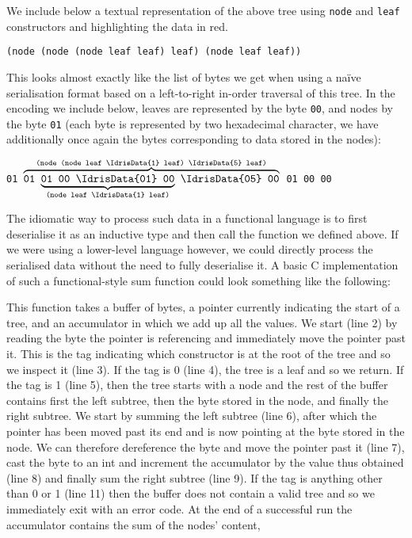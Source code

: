 We include below a textual representation of the above tree using
\texttt{node} and \texttt{leaf} constructors and highlighting the
data in red.

\medskip
  \texttt{(node (node (node leaf  leaf)  leaf)  (node leaf  leaf))}
\medskip

This looks almost exactly like the list of bytes we get when using a
naïve serialisation format based on a left-to-right in-order traversal
of this tree.
%
In the encoding we include below,
leaves are represented by the byte \texttt{00},
and nodes by the byte \texttt{01}
(each byte is represented by two hexadecimal character,
we have additionally once again  the bytes
corresponding to data stored in the nodes):

\medskip
\texttt{01 $\overbrace{\texttt{01 $\underbrace{\texttt{01 00 \IdrisData{01} 00}}_{\texttt{(node leaf \IdrisData{1} leaf)}}$
    \IdrisData{05} 00}}^{\texttt{(node (node leaf \IdrisData{1} leaf) \IdrisData{5} leaf)}}$
     01 00  00}
\medskip

The idiomatic way to process such data in a functional language
is to first deserialise it as an inductive type and then call
the  function we defined above.
%
If we were using a lower-level language however, we could directly
process the serialised data without the need to fully deserialise it.
%
A basic C implementation of such a functional-style sum function
could look something like the following:



This function takes a buffer of bytes,
a pointer currently indicating the start of a tree,
and an accumulator in which we add up all the values.
%
We start (line 2) by reading the byte the pointer is referencing and
immediately move the pointer past it.
%
This is the tag indicating which constructor is at the root of the tree
and so we inspect it (line 3).
%
If the tag is 0 (line 4), the tree is a leaf and so we return.
%
If the tag is 1 (line 5), then the tree starts with a node and the rest
of the buffer contains
first the left subtree,
then the byte stored in the node,
and finally the right subtree.
%
We start by summing the left subtree (line 6),
after which the pointer has been moved past its end and is now pointing
at the byte stored in the node.
We can therefore dereference the byte and move the pointer past it (line 7),
cast the byte to an int and increment the accumulator by the value thus obtained (line 8)
and finally sum the right subtree (line 9).
%
If the tag is anything other than 0 or 1 (line 11) then the buffer does not
contain a valid tree and so we immediately exit with an error code.
%
At the end of a successful run the accumulator contains the sum of the nodes' content,


